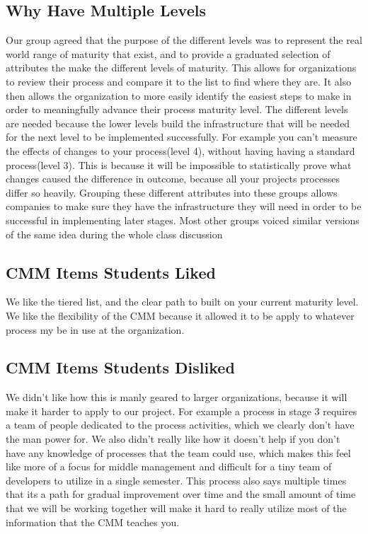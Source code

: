 \documentclass[11pt, indentfirst]{article}
\begin{document}
  \subsection{Why Have Multiple Levels}

  Our group agreed that the purpose of the different levels was to represent the real world range of maturity that exist, and to provide a graduated selection of attributes
  the make the different levels of maturity. This allows for organizations to review their process and compare it to the list to find where they are. It also
  then allows the organization to more easily identify the easiest steps to make in order to meaningfully advance their process maturity level. The different levels
  are needed because the lower levels build the infrastructure that will be needed for the next level to be implemented successfully. For example you can't measure
  the effects of changes to your process(level 4), without having having a standard process(level 3). This is because it will be impossible to statistically prove
  what changes caused the difference in outcome, because all your projects processes differ so heavily.
  Grouping these different attributes into these groups allows companies to make sure they have the infrastructure they will need
  in order to be successful in implementing later stages. Most other groups voiced similar versions of the same idea during the whole class discussion

  \subsection{CMM Items Students Liked}

  We like the tiered list, and the clear path to built on your current maturity level. We like the flexibility of the CMM
  because it allowed it to be apply to whatever process my be in use at the organization.

  \subsection{CMM Items Students Disliked}

  We didn't like how this is manly geared to larger organizations, because it will make it harder to apply to our project. For example a process in stage 3 requires
  a team of people dedicated to the process activities, which we clearly don't have the man power for. We also didn't really like how it doesn't help if you don't
  have any knowledge of processes that the team could use, which makes this feel like more of a focus for middle management and difficult for a tiny team of developers to
  utilize in a single semester. This process also says multiple times that its a path for gradual improvement over time and the small amount of time that we will
  be working together will make it hard to really utilize most of the information that the CMM teaches you.
\end{document}

